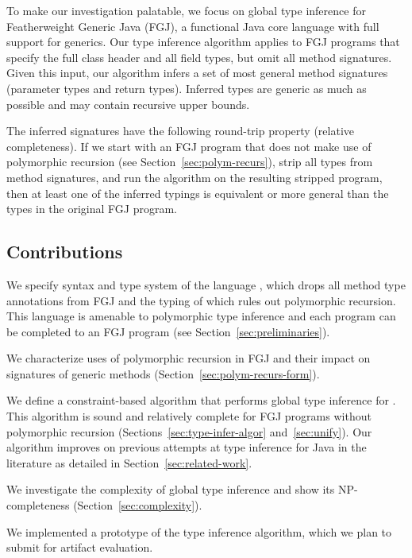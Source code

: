 To make our investigation palatable, we focus on global type inference for Featherweight
Generic Java \cite{DBLP:journals/toplas/IgarashiPW01} (FGJ), a
functional Java core language with full support for generics. Our type inference algorithm
applies to FGJ programs that specify the full class header and all field types,
but omit all method signatures. 
Given this input, our algorithm
infers a set of most general method signatures (parameter types and return types).
Inferred types are generic as much as possible and may contain
recursive upper bounds.

The inferred signatures have the following round-trip property
(relative completeness). If we
start with an FGJ program that does not make use of polymorphic
recursion (see Section~\ref{sec:polym-recurs}), strip all types from
method signatures, and run the algorithm on the 
resulting stripped program, then at least one of the inferred typings is equivalent or more
general than the types in the original FGJ program.






\subsection*{Contributions}
\label{sec:contributions}


We specify syntax and type system of the language \FGJGT, which drops all method type
annotations from FGJ and the typing of which rules out polymorphic
recursion. This language is amenable to polymorphic type inference and
each \FGJGT program can be completed to an FGJ program (see Section~\ref{sec:preliminaries}). 

We characterize uses of polymorphic recursion in FGJ and their impact
on signatures of generic methods (Section~\ref{sec:polym-recurs-form}). 

We define a constraint-based algorithm that performs global type
inference for \FGJGT. This algorithm is sound and relatively complete
for FGJ programs without polymorphic recursion
(Sections~\ref{sec:type-infer-algor} and~\ref{sec:unify}). Our algorithm improves
on previous attempts at type inference for Java in the literature as detailed in
Section~\ref{sec:related-work}. 

We investigate the complexity of global type inference and show its NP-completeness (Section~\ref{sec:complexity}).

We implemented a prototype of the type inference algorithm, which we
plan to submit for artifact evaluation.

